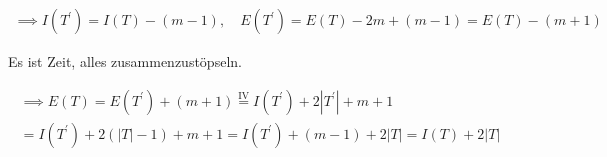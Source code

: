 \begin{solution}
\begin{enumerate}[label = \alph*)]
    \begin{align*}
        \implies
        I(T^\prime) = I(T) - (m - 1),
        \quad
        E(T^\prime) = E(T) - 2 m + (m - 1) = E(T) - (m + 1)
    \end{align*}

    Es ist Zeit, alles zusammenzustöpseln.

    \begin{multline*}
        \implies
        E(T)
        =
        E(T^\prime) + (m + 1)
        \stackrel
        {
            \mathrm{IV}
        }{=}
        I(T^\prime) + 2 |T^\prime| + m + 1 \\
        =
        I(T^\prime) + 2 (|T| - 1) + m + 1
        =
        I(T^\prime) + (m - 1) + 2 |T|
        =
        I(T) + 2 |T|
    \end{multline*}

\end{enumerate}

\end{solution}

